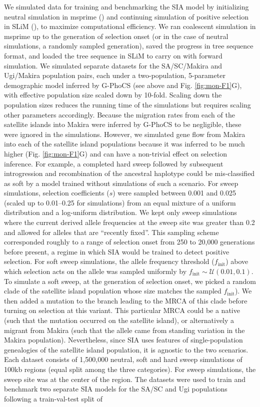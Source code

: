 We simulated data for training and benchmarking the \ac{SIA} model by initializing neutral simulation in msprime (\cite{kelleher2016efficient}) and continuing simulation of positive selection in SLiM (\cite{haller_slim_2019,haller_tree-sequence_2019}), to maximize computational efficiency. We ran coalescent simulation in msprime up to the generation of selection onset (or in the case of neutral simulations, a randomly sampled generation), saved the progress in tree sequence format, and loaded the tree sequence in SLiM to carry on with forward simulation. We simulated separate datasets for the \ac{SA/SC}/Makira and Ugi/Makira population pairs, each under a two-population, 5-parameter demographic model inferred by G-PhoCS (see above and Fig. \ref{fig:mon-F1}G), with effective population size scaled down by 10-fold. Scaling down the population sizes reduces the running time of the simulations but requires scaling other parameters accordingly. Because the migration rates from each of the satellite islands into Makira were inferred by G-PhoCS to be negligible, these were ignored in the simulations. However, we simulated gene flow from Makira into each of the satellite island populations because it was inferred to be much higher (Fig. \ref{fig:mon-F1}G) and can have a non-trivial effect on selection inference. For example, a completed hard sweep followed by subsequent introgression and recombination of the ancestral haplotype could be mis-classified as soft by a model trained without simulations of such a scenario. For sweep simulations, selection coefficients ($s$) were sampled between 0.001 and 0.025 (scaled up to 0.01–0.25 for simulations) from an equal mixture of a uniform distribution and a log-uniform distribution. We kept only sweep simulations where the current derived allele frequencies at the sweep site was greater than 0.2 and allowed for alleles that are “recently fixed”. This sampling scheme corresponded roughly to a range of selection onset from 250 to 20,000 generations before present, a regime in which \ac{SIA} would be trained to detect positive selection. For soft sweep simulations, the allele frequency threshold ($f_{\mathrm{init}}$) above which selection acts on the allele was sampled uniformly by $f_{\mathrm{init}} \sim \mathcal{U}(0.01, 0.1)$. To simulate a soft sweep, at the generation of selection onset, we picked a random clade of the satellite island population whose size matches the sampled $f_{\mathrm{init}}$). We then added a mutation to the branch leading to the \acs{MRCA} of this clade before turning on selection at this variant. This particular \acs{MRCA} could be a native (such that the mutation occurred on the satellite island), or alternatively a migrant from Makira (such that the allele came from standing variation in the Makira population). Nevertheless, since \ac{SIA} uses features of single-population genealogies of the satellite island population, it is agnostic to the two scenarios. Each dataset consists of 1,500,000 neutral, soft and hard sweep simulations of 100kb regions (equal split among the three categories). For sweep simulations, the sweep site was at the center of the region. The datasets were used to train and benchmark two separate \ac{SIA} models for the \ac{SA/SC} and Ugi populations following a train-val-test split of 